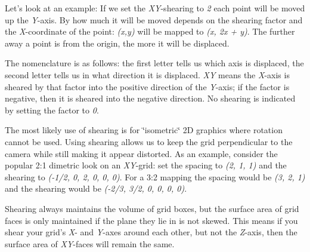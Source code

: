  Let's look at an example\+: If we set the {\itshape X\+Y}-\/shearing to {\itshape 2} each point will be moved up the {\itshape Y}-\/axis. By how much it will be moved depends on the shearing factor and the {\itshape X}-\/coordinate of the point\+: {\itshape (x,y)} will be mapped to {\itshape (x, 2x + y)}. The further away a point is from the origin, the more it will be displaced.

The nomenclature is as follows\+: the first letter tells us which axis is displaced, the second letter tells us in what direction it is displaced. {\itshape X\+Y} means the {\itshape X}-\/axis is sheared by that factor into the positive direction of the {\itshape Y}-\/axis; if the factor is negative, then it is sheared into the negative direction. No shearing is indicated by setting the factor to {\itshape 0}.

The most likely use of shearing is for \char`\"{}isometric\char`\"{} 2\+D graphics where rotation cannot be used. Using shearing allows us to keep the grid perpendicular to the camera while still making it appear distorted. As an example, consider the popular 2\+:1 dimetric look on an {\itshape X\+Y}-\/grid\+: set the spacing to {\itshape (2, 1, 1)} and the shearing to {\itshape (-\/1/2, 0, 2, 0, 0, 0)}. For a 3\+:2 mapping the spacing would be {\itshape (3, 2, 1)} and the shearing would be {\itshape (-\/2/3, 3/2, 0, 0, 0, 0)}.

Shearing always maintains the volume of grid boxes, but the surface area of grid faces is only maintained if the plane they lie in is not skewed. This means if you shear your grid's {\itshape X}-\/ and {\itshape Y}-\/axes around each other, but not the {\itshape Z}-\/axis, then the surface area of {\itshape X\+Y}-\/faces will remain the same. 